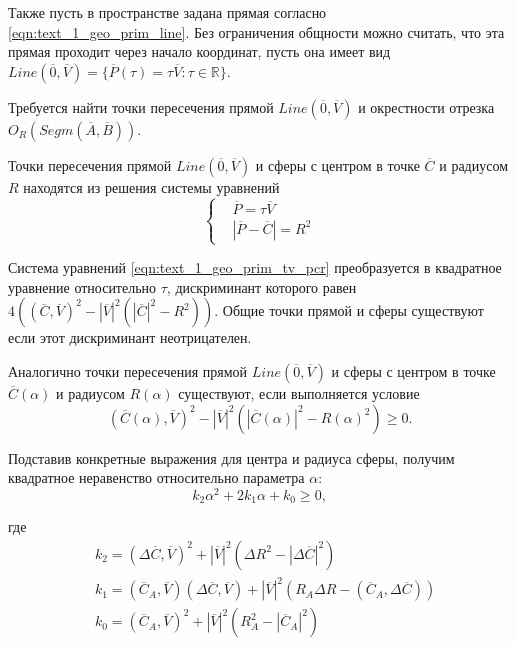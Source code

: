 Также пусть в пространстве задана прямая согласно \eqref{eqn:text_1_geo_prim_line}.
Без ограничения общности можно считать, что эта прямая проходит через начало координат, пусть она имеет вид $Line(\overline{0}, \overline{V}) = \{ \overline{P}(\tau) = \tau \overline{V}: \tau \in \mathbb{R} \}$.

Требуется найти точки пересечения прямой $Line(\overline{0}, \overline{V})$ и окрестности отрезка $O_R(Segm(\overline{A}, \overline{B}))$.

Точки пересечения прямой $Line(\overline{0}, \overline{V})$ и сферы с центром в точке $\overline{C}$ и радиусом $R$ находятся из решения системы уравнений
\begin{equation}\label{eqn:text_1_geo_prim_tv_pcr}
	\left\{
		\begin{aligned}
			& \overline{P} = \tau \overline{V} \\
			& |\overline{P} - \overline{C}| = R^2
		\end{aligned}
	\right.
\end{equation}

Система уравнений \eqref{eqn:text_1_geo_prim_tv_pcr} преобразуется в квадратное уравнение относительно $\tau$, дискриминант которого равен $4\left((\overline{C}, \overline{V})^2 - |\overline{V}|^2 \left(|\overline{C}|^2 - R^2\right)\right)$.
Общие точки прямой и сферы существуют если этот дискриминант неотрицателен.

Аналогично точки пересечения прямой $Line(\overline{0}, \overline{V})$ и сферы с центром в точке $\overline{C}(\alpha)$ и радиусом $R(\alpha)$ существуют, если выполняется условие
\begin{equation}
	(\overline{C}(\alpha), \overline{V})^2 - |\overline{V}|^2 \left(|\overline{C}(\alpha)|^2 - R(\alpha)^2\right) \ge 0.
\end{equation}

Подставив конкретные выражения для центра и радиуса сферы, получим квадратное неравенство относительно параметра $\alpha$:
\begin{equation}\label{eqn:text_1_geo_prim_ineq_k2k1k0}
	k_2 \alpha^2 + 2 k_1 \alpha + k_0 \ge 0,
\end{equation}

где
\begin{equation}\label{eqn:text_1_geo_prim_k2k1k0}
	\begin{aligned}
		& k_2 = (\Delta \overline{C}, \overline{V})^2 + |\overline{V}|^2 \left( \Delta R^2 - |\Delta \overline{C}|^2 \right) \\
		& k_1 = (\overline{C}_A, \overline{V})(\Delta \overline{C}, \overline{V}) + |\overline{V}|^2 \left(R_A \Delta R - (\overline{C}_A, \Delta \overline{C}) \right) \\
		& k_0 = (\overline{C}_A, \overline{V})^2 + |\overline{V}|^2 \left( R_A^2 - |\overline{C}_A|^2 \right)
	\end{aligned}
\end{equation}


